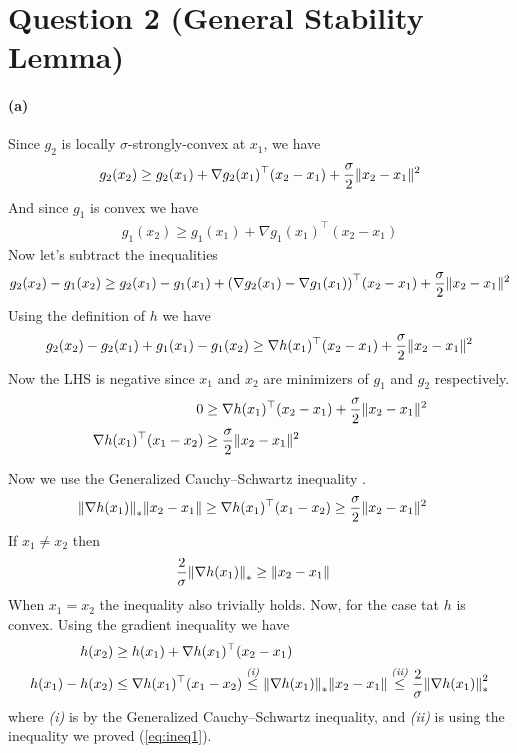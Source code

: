 \documentclass{article}
\DeclarePairedDelimiter\br{(}{)}%
\DeclarePairedDelimiter\norm{\lVert}{\rVert}%
\newcommand{\textrel}[2]{\stackrel{\textit{\text{#1}}}{#2} }
\begin{document}
\section{Question 2 (General Stability Lemma)}
\paragraph{(a)}
Since $g_2$ is locally $\sigma$-strongly-convex at $x_1$, we have 
\begin{align*}
    g_2(x_2) \geq g_2(x_1) + \nabla g_2(x_1)^\top (x_2 - x_1) + \frac{\sigma}{2} \norm{x_2-x_1}^2
\end{align*}
And since $g_1$ is convex we have 
\begin{align*}
    g_1(x_2) \geq g_1(x_1) + \nabla g_1(x_1)^\top (x_2 - x_1)  
\end{align*}
Now let's subtract the inequalities
\begin{align*}
    g_2(x_2) -  g_1(x_2) \geq g_2(x_1) - g_1(x_1) + \br*{\nabla g_2(x_1) - \nabla g_1(x_1)}^\top (x_2 - x_1) + \frac{\sigma}{2} \norm{x_2-x_1}^2
\end{align*}
Using the definition of $h$ we have
\begin{align*}
    g_2(x_2)  - g_2(x_1) + g_1(x_1) -  g_1(x_2) \geq   \nabla h(x_1) ^\top (x_2 - x_1)  + \frac{\sigma}{2} \norm{x_2-x_1}^2
\end{align*}
Now the LHS is negative since $x_1$ and $x_2$ are minimizers of $g_1$ and $g_2$ respectively.
\begin{align*}
     0 &\geq   \nabla h(x_1) ^\top (x_2 - x_1)  +  \frac{\sigma}{2} \norm{x_2-x_1}^2\\
       \nabla h(x_1) ^\top (x_1 - x_2)  &\geq      \frac{\sigma}{2} \norm{x_2-x_1}^2
\end{align*}

Now we use the Generalized Cauchy–Schwartz inequality .
\begin{align*}
\norm*{\nabla h(x_1)}_{*}    \norm{x_2-x_1}  &\geq     \nabla h(x_1) ^\top (x_1 - x_2)    \geq    \frac{\sigma}{2} \norm{x_2-x_1}^2
\end{align*}
If $x_1 \neq x_2$ then
\begin{align} \label{eq:ineq1}
\frac{2}{\sigma} \norm*{\nabla h(x_1)}_{*}   &\geq  \norm{x_2-x_1}
\end{align}
When $x_1 = x_2$ the inequality also trivially holds.
\newline\newline
Now, for the case tat $h$ is convex. Using the gradient inequality we have
\begin{align*}
    h(x_2) &\geq h(x_1) + \nabla h(x_1)^\top (x_2-x_1) \\
    h(x_1)-h(x_2) &\leq \nabla h(x_1)^\top (x_1-x_2) \textrel{(i)}{\leq} \norm*{\nabla h(x_1)}_{*}    \norm{x_2-x_1}  
    \textrel{(ii)}{\leq} \frac{2}{\sigma} \norm*{\nabla h(x_1)}^2_{*} 
\end{align*}
where \textit{(i)} is by the Generalized Cauchy–Schwartz inequality, and  \textit{(ii)} is using the inequality we proved (\ref{eq:ineq1}).
\end{document}

